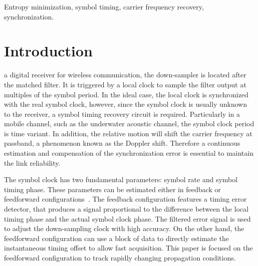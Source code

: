 \documentclass[journal,comsoc]{IEEEtran}
\begin{document}
\begin{IEEEkeywords}
Entropy minimization, symbol timing, carrier frequency recovery, synchronization.
\end{IEEEkeywords}

\IEEEpeerreviewmaketitle

\section{Introduction}
\label{sec:intro}
 a digital receiver for wireless communication, 
the down-sampler is located after the matched filter.
It is triggered by a local clock to sample the filter output at multiples of the symbol period.
In the ideal case, the local clock is synchronized with the real symbol clock, however, since the symbol clock is usually unknown to the receiver, a symbol timing recovery circuit is required.
Particularly in a mobile channel, such as the underwater acoustic channel, the symbol clock period is time variant.
In addition, the relative motion will shift the carrier frequency at passband, a phenomenon known as the Doppler shift. 
Therefore a continuous estimation and compensation of the synchronization error is essential to maintain the link reliability.

The symbol clock has two fundamental parameters: symbol rate and symbol timing phase.
These parameters can be estimated either in feedback or feedforward configurations~\cite{mengali1997synchronization}.
The feedback configuration features a timing error detector, 
that produces a signal proportional to the difference between the local timing phase and the actual symbol clock phase.
The filtered error signal is used to adjust the down-sampling clock with high accuracy.
On the other hand, the feedforward configuration can use a block of data to directly estimate the instantaneous timing offset to allow fast acquisition.
This paper is focused on the feedforward configuration to track rapidly changing propagation conditions.
\end{document}
